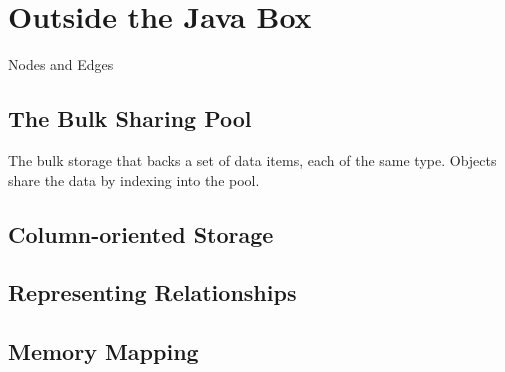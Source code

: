 \chapter{Outside the Java Box}
\label{chapter:outisde-java-box}

\begin{example}{Nodes and Edges}

\end{example}

\section{The Bulk Sharing Pool}
\label{sec:bulk-sharing-pool}

The
bulk storage that backs a set of data items, each of the same type.
Objects share
the data by indexing into the pool.

\section{Column-oriented Storage}

\section{Representing Relationships}

\section{Memory Mapping}